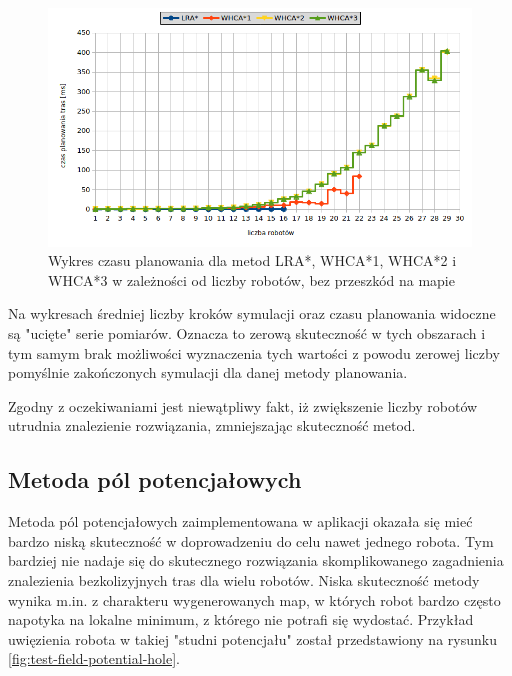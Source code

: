 \begin{figure}[H]
	\centering
	\includegraphics[width=0.9\columnwidth]{img/plots/test-steps-empty-robots-calctime}
	\caption{Wykres czasu planowania dla metod LRA*, WHCA*1, WHCA*2 i WHCA*3 w zależności od liczby robotów, bez przeszkód na mapie}
	\label{fig:test-steps-empty-robots-calctime}
\end{figure}

Na wykresach średniej liczby kroków symulacji oraz czasu planowania widoczne są "ucięte" serie pomiarów. Oznacza to zerową skuteczność w tych obszarach i tym samym brak możliwości wyznaczenia tych wartości z powodu zerowej liczby pomyślnie zakończonych symulacji dla danej metody planowania.

Zgodny z oczekiwaniami jest niewątpliwy fakt, iż zwiększenie liczby robotów utrudnia znalezienie rozwiązania, zmniejszając skuteczność metod.

\subsection{Metoda pól potencjałowych}
Metoda pól potencjałowych zaimplementowana w aplikacji okazała się mieć bardzo niską skuteczność w doprowadzeniu do celu nawet jednego robota.
Tym bardziej nie nadaje się do skutecznego rozwiązania skomplikowanego zagadnienia znalezienia bezkolizyjnych tras dla wielu robotów.
Niska skuteczność metody wynika m.in. z charakteru wygenerowanych map, w których robot bardzo często napotyka na lokalne minimum, z którego nie potrafi się wydostać.
Przykład uwięzienia robota w takiej "studni potencjału" został przedstawiony na rysunku \ref{fig:test-field-potential-hole}.

